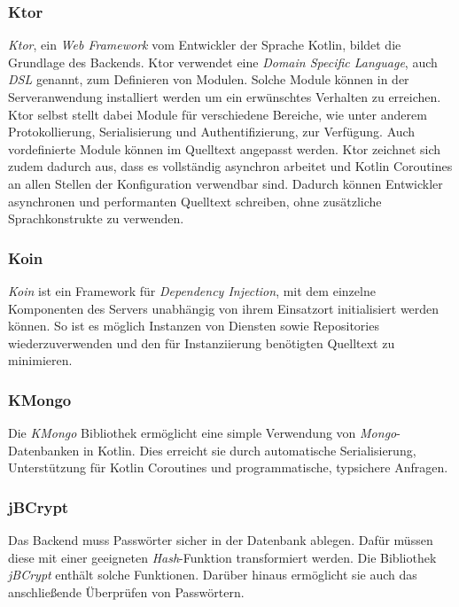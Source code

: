 \subsubsection{Ktor}
\label{subsubsec:backend:bibs:ktor}
\textit{Ktor}, ein \textit{Web Framework} vom Entwickler der Sprache Kotlin, bildet die Grundlage des Backends.
Ktor verwendet eine \textit{Domain Specific Language}, auch \textit{DSL} genannt, zum Definieren von Modulen.
Solche Module können in der Serveranwendung installiert werden um ein erwünschtes Verhalten zu erreichen.
Ktor selbst stellt dabei Module für verschiedene Bereiche, wie unter anderem Protokollierung, Serialisierung und Authentifizierung, zur Verfügung.
Auch vordefinierte Module können im Quelltext angepasst werden.
Ktor zeichnet sich zudem dadurch aus, dass es vollständig asynchron arbeitet und Kotlin Coroutines an allen Stellen der Konfiguration verwendbar sind.
Dadurch können Entwickler asynchronen und performanten Quelltext schreiben, ohne zusätzliche Sprachkonstrukte zu verwenden.

\subsubsection{Koin}
\label{subsubsec:backend:bibs:koin}
\textit{Koin} ist ein Framework für \textit{Dependency Injection}, mit dem einzelne Komponenten des Servers unabhängig von ihrem Einsatzort initialisiert werden können.
So ist es möglich Instanzen von Diensten sowie Repositories wiederzuverwenden und den für Instanziierung benötigten Quelltext zu minimieren.

\subsubsection{KMongo}
\label{subsubsec:backend:bibs:kmongo}
Die \textit{KMongo} Bibliothek ermöglicht eine simple Verwendung von \textit{Mongo}-Datenbanken in Kotlin.
Dies erreicht sie durch automatische Serialisierung, Unterstützung für Kotlin Coroutines und programmatische, typsichere Anfragen.

\subsubsection{jBCrypt}
\label{subsubsec:backend:bibs:jbcrypt}
Das Backend muss Passwörter sicher in der Datenbank ablegen.
Dafür müssen diese mit einer geeigneten \textit{Hash}-Funktion transformiert werden.
Die Bibliothek \textit{jBCrypt} enthält solche Funktionen.
Darüber hinaus ermöglicht sie auch das anschließende Überprüfen von Passwörtern.

